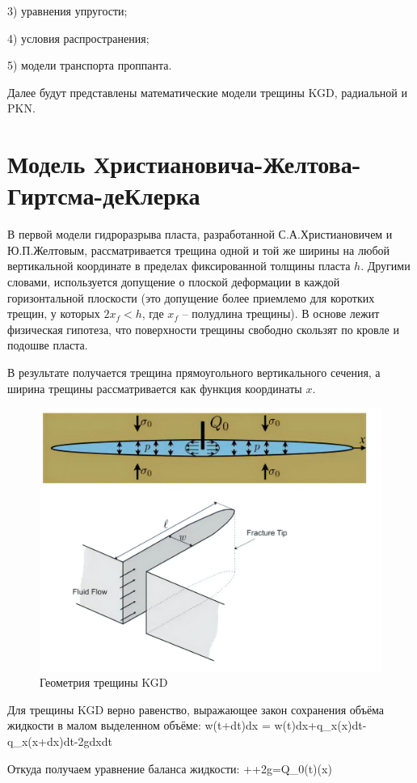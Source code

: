 3) уравнения упругости;

4) условия распространения;

5) модели транспорта проппанта.

Далее будут представлены математические модели трещины KGD, радиальной и PKN.

\section{Модель Христиановича-Желтова-Гиртсма-деКлерка}

В первой модели гидроразрыва пласта, разработанной С.А.Христиановичем и Ю.П.Желтовым, рассматривается трещина одной и той же ширины на любой вертикальной координате в пределах фиксированной толщины пласта $h$.
Другими словами, используется допущение о плоской деформации в каждой горизонтальной плоскости (это допущение более приемлемо для коротких трещин, у которых $2x_f<h$, где $x_f$ -- полудлина трещины).
В основе лежит физическая гипотеза, что поверхности трещины свободно скользят по кровле и подошве пласта.

В результате получается трещина прямоугольного вертикального сечения, а ширина трещины рассматривается как функция координаты $x$.

\begin{figure}[H] 
\center
\includegraphics[width=0.7\linewidth]{images/kgd_model_better.jpg}
\caption{Геометрия трещины KGD} 
\label{fig:kgd-model-geometry}  
\end{figure}


Для трещины KGD верно равенство, выражающее закон сохранения объёма жидкости в малом выделенном объёме:
\beq
w(t+dt)dx = w(t)dx+q_x(x)dt-q_x(x+dx)dt-2gdxdt
\eeq

Откуда получаем уравнение баланса жидкости:
\beq
{}++2g=Q_0(t)\delta(x)
\eeq

